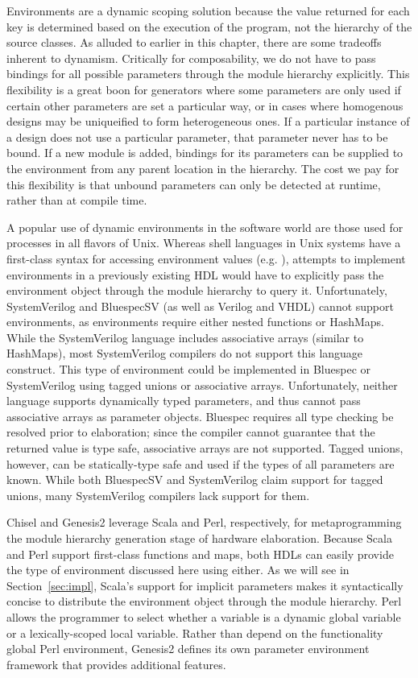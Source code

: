 Environments are a dynamic scoping solution because the value returned for each key is determined based on the execution of the program,
not the hierarchy of the source classes.
As alluded to earlier in this chapter, there are some tradeoffs inherent to dynamism.
Critically for composability, we do not have to pass bindings for all possible parameters through the module hierarchy explicitly.
This flexibility is a great boon for generators where some parameters are only used if certain other parameters are set a particular way,
or in cases where homogenous designs may be uniqueified to form heterogeneous ones.
If a particular instance of a design does not use a particular parameter, that parameter never has to be bound.
If a new module is added, bindings for its parameters can be supplied to the environment from any parent location in the hierarchy.
The cost we pay for this flexibility is that unbound parameters can only be detected at runtime, rather than at compile time.

A popular use of dynamic environments in the software world are those used for processes in all flavors of Unix.
Whereas shell languages in Unix systems have a first-class syntax for accessing environment values (e.g. ),
attempts to implement environments in a previously existing HDL would have to explicitly pass the environment object through the module hierarchy to query it.
Unfortunately, SystemVerilog and BluespecSV (as well as Verilog and VHDL) cannot support environments, as environments require either nested functions or HashMaps.
While the SystemVerilog language includes associative arrays (similar to HashMaps), most SystemVerilog compilers do not support this language construct. 
This type of environment could be implemented in Bluespec or SystemVerilog using tagged unions or associative arrays.
Unfortunately, neither language supports dynamically typed parameters, and thus cannot pass associative arrays as parameter objects.
Bluespec requires all type checking be resolved prior to elaboration; since the compiler cannot guarantee that the returned value is type safe, associative arrays are not supported. 
Tagged unions, however, can be statically-type safe and used if the types of all parameters are known.
While both BluespecSV and SystemVerilog claim support for tagged unions, many SystemVerilog compilers lack support for them.

Chisel and Genesis2 leverage Scala and Perl, respectively, for metaprogramming the module hierarchy generation stage of hardware elaboration.
Because Scala and Perl support first-class functions and maps, both HDLs can easily provide the type of environment discussed here using either.
As we will see in Section~\ref{sec:impl}, Scala's support for implicit parameters makes it syntactically concise to distribute
the environment object through the module hierarchy.
Perl allows the programmer to select whether a variable is a dynamic global variable or a lexically-scoped local variable.
Rather than depend on the functionality global Perl environment, Genesis2 defines its own parameter environment framework that provides additional features.


